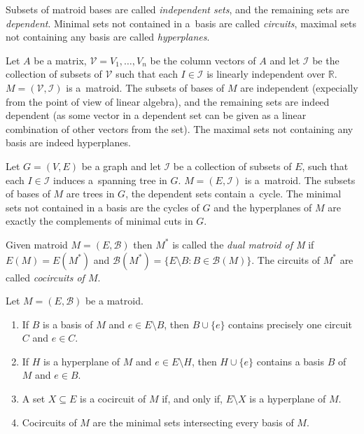 Subsets of matroid bases are called \textit{independent sets}, and the remaining sets are \textit{dependent}. Minimal sets not contained in a~basis are called \textit{circuits}, maximal sets not containing any basis are called \textit{hyperplanes}.

\begin{exmp*}
	Let $A$ be a matrix, $\mathcal{V} = V_1,\ldots,V_n$ be the column vectors of $A$ and let $\mathcal{I}$ be the collection of subsets of $\mathcal{V}$ such that each $I \in \mathcal{I}$ is linearly independent over $\mathbb{R}$. $M = (\mathcal{V}, \mathcal{I})$ is a~matroid. The subsets of bases of $M$ are independent (expecially from the point of view of linear algebra), and the remaining sets are indeed dependent (as some vector in a dependent set can be given as a linear combination of other vectors from the set). The maximal sets not containing any basis are indeed hyperplanes.
\end{exmp*}

\begin{exmp*}
Let $G = (V, E)$ be a graph and let $\mathcal{I}$ be a collection of subsets of $E$, such that each $I \in \mathcal{I}$ induces a~spanning tree in $G$. $M = (E, \mathcal{I})$ is a~matroid. The subsets of bases of $M$ are trees in $G$, the dependent sets contain a~cycle. The minimal sets not contained in a basis are the cycles of $G$ and the hyperplanes of $M$ are exactly the complements of minimal cuts in $G$.
\end{exmp*}

\begin{defn}
Given matroid $M = (E,\mathcal{B})$ then $M^*$ is called the \textit{dual matroid of M} if $E(M) = E(M^*)$ and $\mathcal{B}(M^*) = \{E \setminus B : B \in \mathcal{B}(M) \}$. The circuits of $M^*$ are called \textit{cocircuits of $M$}.
\end{defn}


\begin{claim}
	\label{matroid_folklore}
	Let $M = (E, \mathcal{B})$ be a matroid.

	\begin{enumerate}[label=\alph*.]
		\item If $B$ is a basis of $M$ and $e \in E \setminus B$, then $B \cup \{e\}$ contains precisely one circuit $C$ and $e \in C$.
		\item If $H$ is a hyperplane of $M$ and $e \in E \setminus H$, then $H \cup \{e\}$ contains a basis $B$ of $M$ and $e \in B$.
		\item A set $X \subseteq E$ is a cocircuit of $M$ if, and only if, $E \setminus X$ is a hyperplane of $M$.
		\item Cocircuits of $M$ are the minimal sets intersecting every basis of $M$.
	\end{enumerate}
\end{claim}
